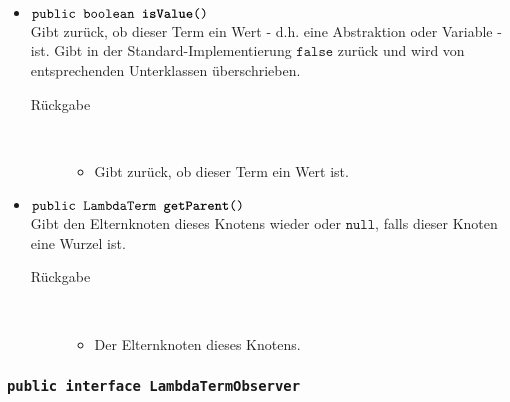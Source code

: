 \begin{description}
\begin{itemize}
		\item $\texttt{public boolean \textbf{isValue}()}$ \\ Gibt zurück, ob dieser Term ein Wert - d.h. eine Abstraktion oder Variable - ist. Gibt in der Standard-Implementierung $\texttt{false}$ zurück und wird von entsprechenden Unterklassen überschrieben.
		\begin{description}
			\item[Rückgabe] \hfill \\
			\vspace{-.8cm}
			\begin{itemize}
				\item Gibt zurück, ob dieser Term ein Wert ist.
			\end{itemize}
		\end{description}
		
		\item $\texttt{public LambdaTerm \textbf{getParent}()}$ \\ Gibt den Elternknoten dieses Knotens wieder oder $\texttt{null}$, falls dieser Knoten eine Wurzel ist.
		\begin{description}
			\item[Rückgabe] \hfill \\
			\vspace{-.8cm}
			\begin{itemize}
				\item Der Elternknoten dieses Knotens.
			\end{itemize}
		\end{description}
	\end{itemize}
\end{description}

\subsubsection{\normalfont \texttt{public interface \textbf{LambdaTermObserver}}}

